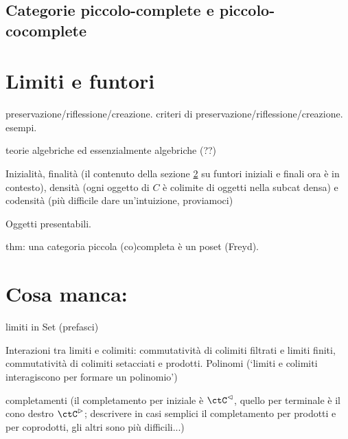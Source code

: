 \subsection{Categorie piccolo-complete e piccolo-cocomplete}

\section{Limiti e funtori}

preservazione/riflessione/creazione. criteri di preservazione/riflessione/creazione. esempi.

teorie algebriche ed essenzialmente algebriche (??)


Inizialità, finalità (il contenuto della sezione \ref{} su funtori iniziali e finali ora è in contesto), densità (ogni oggetto di \(C\) è colimite di oggetti nella subcat densa) e codensità (più difficile dare un'intuizione, proviamoci)

Oggetti presentabili.

thm: una categoria piccola (co)completa è un poset (Freyd).

\section{Cosa manca:}



limiti in Set (prefasci)

Interazioni tra limiti e colimiti: commutatività di colimiti filtrati e limiti finiti, commutatività di colimiti setacciati e prodotti. Polinomi (`limiti e colimiti interagiscono per formare un polinomio')

completamenti (il completamento per iniziale è \(\ctC^\lhd\), quello per terminale è il cono destro \(\ctC^\rhd\); descrivere in casi semplici il completamento per prodotti e per coprodotti, gli altri sono più difficili...)

